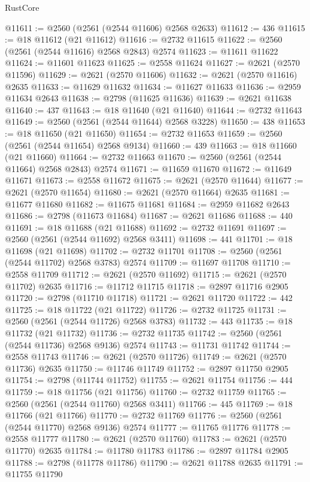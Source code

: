 \begin{lexlean}{RustCore}
\begin{coremodule}
@11611 := @2560 (@2561 (@2544 @11606) @2568 @2633)
@11612 := 436
@11615 := @18 @11612 (@21 @11612)
@11616 := @2732 @11615
@11622 := @2560 (@2561 (@2544 @11616) @2568 @2843) @2574
@11623 := @11611 @11622
@11624 := @11601 @11623
@11625 := @2558 @11624
@11627 := @2621 (@2570 @11596)
@11629 := @2621 (@2570 @11606)
@11632 := @2621 (@2570 @11616) @2635
@11633 := @11629 @11632
@11634 := @11627 @11633
@11636 := @2959 @11634 @2643
@11638 := @2798 (@11625 @11636)
@11639 := @2621 @11638
@11640 := 437
@11643 := @18 @11640 (@21 @11640)
@11644 := @2732 @11643
@11649 := @2560 (@2561 (@2544 @11644) @2568 @3228)
@11650 := 438
@11653 := @18 @11650 (@21 @11650)
@11654 := @2732 @11653
@11659 := @2560 (@2561 (@2544 @11654) @2568 @9134)
@11660 := 439
@11663 := @18 @11660 (@21 @11660)
@11664 := @2732 @11663
@11670 := @2560 (@2561 (@2544 @11664) @2568 @2843) @2574
@11671 := @11659 @11670
@11672 := @11649 @11671
@11673 := @2558 @11672
@11675 := @2621 (@2570 @11644)
@11677 := @2621 (@2570 @11654)
@11680 := @2621 (@2570 @11664) @2635
@11681 := @11677 @11680
@11682 := @11675 @11681
@11684 := @2959 @11682 @2643
@11686 := @2798 (@11673 @11684)
@11687 := @2621 @11686
@11688 := 440
@11691 := @18 @11688 (@21 @11688)
@11692 := @2732 @11691
@11697 := @2560 (@2561 (@2544 @11692) @2568 @3411)
@11698 := 441
@11701 := @18 @11698 (@21 @11698)
@11702 := @2732 @11701
@11708 := @2560 (@2561 (@2544 @11702) @2568 @3783) @2574
@11709 := @11697 @11708
@11710 := @2558 @11709
@11712 := @2621 (@2570 @11692)
@11715 := @2621 (@2570 @11702) @2635
@11716 := @11712 @11715
@11718 := @2897 @11716 @2905
@11720 := @2798 (@11710 @11718)
@11721 := @2621 @11720
@11722 := 442
@11725 := @18 @11722 (@21 @11722)
@11726 := @2732 @11725
@11731 := @2560 (@2561 (@2544 @11726) @2568 @3783)
@11732 := 443
@11735 := @18 @11732 (@21 @11732)
@11736 := @2732 @11735
@11742 := @2560 (@2561 (@2544 @11736) @2568 @9136) @2574
@11743 := @11731 @11742
@11744 := @2558 @11743
@11746 := @2621 (@2570 @11726)
@11749 := @2621 (@2570 @11736) @2635
@11750 := @11746 @11749
@11752 := @2897 @11750 @2905
@11754 := @2798 (@11744 @11752)
@11755 := @2621 @11754
@11756 := 444
@11759 := @18 @11756 (@21 @11756)
@11760 := @2732 @11759
@11765 := @2560 (@2561 (@2544 @11760) @2568 @3411)
@11766 := 445
@11769 := @18 @11766 (@21 @11766)
@11770 := @2732 @11769
@11776 := @2560 (@2561 (@2544 @11770) @2568 @9136) @2574
@11777 := @11765 @11776
@11778 := @2558 @11777
@11780 := @2621 (@2570 @11760)
@11783 := @2621 (@2570 @11770) @2635
@11784 := @11780 @11783
@11786 := @2897 @11784 @2905
@11788 := @2798 (@11778 @11786)
@11790 := @2621 @11788 @2635
@11791 := @11755 @11790

\end{coremodule}
\end{lexlean}
